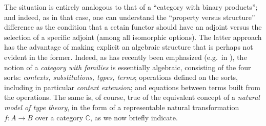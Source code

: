 \documentclass[12pt]{article}
\newcommand{\C}{\ensuremath{\mathbb{C}}}
\theoremstyle{definition}
\begin{document}
The situation is entirely analogous to that of  a ``category with binary products''; and indeed, as in that case, one can understand the ``property versus structure'' difference as the condition that a cetain functor should have an adjoint versus the selection of a specific adjoint (among all isomorphic options).  The latter approach has the advantage of making explicit an algebraic structure that is perhaps not evident in the former. Indeed, as has recently been emphasized (e.g.\ in \cite{BCH}), the notion of a \emph{category with families} is essentially algebraic,  consisting of the four sorts: \emph{contexts, substitutions, types, terms}; operations defined on the sorts, including in particular \emph{context extension}; and equations between terms built from the operations.  The same is, of course, true of the equivalent concept of a \emph{natural model of type theory}, in the form of a representable natural transformation $f : A \to B$ over a category $\C$, as we now briefly indicate.
\end{document}
